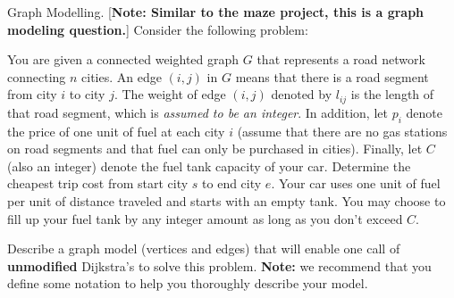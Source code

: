\documentclass[12pt]{exam}
\newcommand{\stars}[1]{%
    \foreach \n in {1,...,#1}{%
        $\filledstar$%
    }%
}
\begin{document}
\begin{questions}

    \question[30] [W6, \stars{5}] Graph Modelling. [{\bf Note: Similar to the maze project, this is a graph modeling question.}] Consider the following problem:

    \begin{mdframed}
        You are given a connected weighted graph $G$ that represents a road network connecting $n$ cities. An edge $(i,j)$ in $G$ means that there is a road segment from city $i$ to city $j$. The weight of edge $(i,j)$ denoted by $l_{ij}$ is the length of that road segment, which is {\em assumed to be an integer}. In addition, let $p_i$ denote the price of one unit of fuel at each city $i$ (assume that there are no gas stations on road segments and that fuel can only be purchased in cities). Finally, let $C$ (also an integer) denote the fuel tank capacity of your car. Determine the cheapest trip cost from start city $s$ to end city $e$. Your car uses one unit of fuel per unit of distance traveled and starts with an empty tank. You may choose to fill up your fuel tank by any integer amount as long as you don't exceed $C$.
    \end{mdframed}

    Describe a graph model (vertices and edges) that will enable one call of \textbf{unmodified} Dijkstra's to solve this problem. \textbf{Note:} we recommend that you define some notation to help you thoroughly describe your model.

\end{questions}
\end{document}
